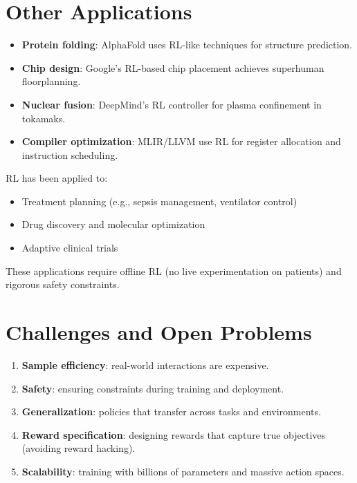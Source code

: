 \section{Other Applications}
\label{sec:app:other}

\begin{example}
\begin{itemize}
    \item \textbf{Protein folding}: AlphaFold uses RL-like techniques
    for structure prediction.
    \item \textbf{Chip design}: Google's RL-based chip placement
    achieves superhuman floorplanning.
    \item \textbf{Nuclear fusion}: DeepMind's RL controller for plasma
    confinement in tokamaks.
    \item \textbf{Compiler optimization}: MLIR/LLVM use RL for register
    allocation and instruction scheduling.
\end{itemize}
\end{example}

\begin{example}[Healthcare]
RL has been applied to:
\begin{itemize}
    \item Treatment planning (e.g., sepsis management, ventilator control)
    \item Drug discovery and molecular optimization
    \item Adaptive clinical trials
\end{itemize}
These applications require offline RL (no live experimentation on
patients) and rigorous safety constraints.
\end{example}

\section{Challenges and Open Problems}
\label{sec:app:challenges}

\begin{attention}[title=\textbf{Key Open Challenges}]
\begin{enumerate}
    \item \textbf{Sample efficiency}: real-world interactions are expensive.
    \item \textbf{Safety}: ensuring constraints during training and
    deployment.
    \item \textbf{Generalization}: policies that transfer across tasks
    and environments.
    \item \textbf{Reward specification}: designing rewards that capture
    true objectives (avoiding reward hacking).
    \item \textbf{Scalability}: training with billions of parameters
    and massive action spaces.
\end{enumerate}
\end{attention}


